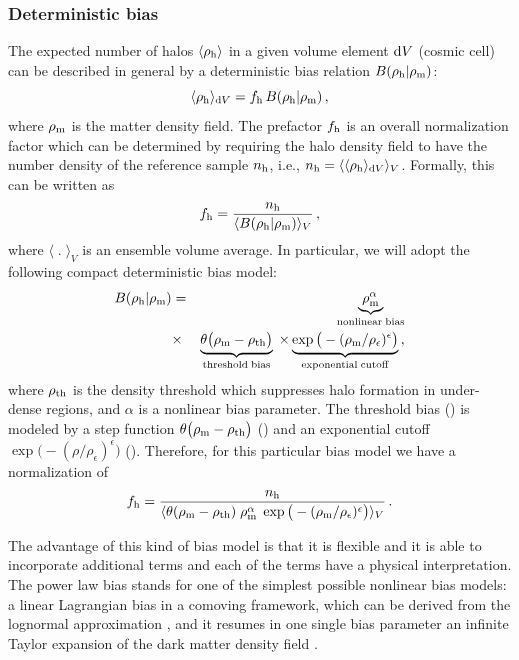 \documentclass[english,usenatbib]{mn2e}
\newcommand{\tod}[1]{{\textcolor{red}{ #1}}}
\newcommand{\be}{\begin{equation}}
\newcommand{\ee}{\end{equation}}
\newcommand{\ba}{\begin{eqnarray}}
\newcommand{\ea}{\end{eqnarray}}
\begin{document}
\subsubsection{Deterministic bias}

The expected number of halos $\langle \rho_{\rm h} \rangle$ in a given volume element ${\rm d}V$ (cosmic cell) can be described in general by a deterministic bias relation $B(\rho_{\rm h}|\rho_{\rm m})$:
\be
\langle \rho_{\rm h} \rangle_{{\rm d}V} = f_{\rm h}\, B(\rho_{\rm h}|\rho_{\rm m})\,,
\ee
where $\rho_{\rm m}$ is the matter density field. The prefactor $f_{\rm h}$ is an overall normalization factor which can be determined by requiring the halo density field to have the number density of the reference sample $n_{\rm h}$, i.e., $n_{\rm h}=\langle\langle \rho_{\rm h}\rangle_{{\rm d}V}\rangle_{V}$. Formally, this can be written as 
\be
f_{\rm h} = \frac{n_{\rm h}}{\langle B(\rho_{\rm h}|\rho_{\rm m}) \rangle_{V}}\,,
\ee
where  $\langle \;.\; \rangle_{V}$ is an ensemble volume average. 
In particular, we will adopt the following compact deterministic bias model:
\ba
B(\rho_{\rm h}|\rho_{\rm m}) &=&  \underbrace{\rho_{\rm  m}^\alpha}_{\mathrm{nonlinear \; bias}} \nonumber \\ 
&\times& \underbrace{\theta\big(\rho_{\rm m} - \rho_{\rm th}\big)}_{\mathrm{threshold \; bias}} \; \times \underbrace{\exp \big(-(\rho_{\rm m}/\rho_{\epsilon})^{\epsilon}\big)}_{\mathrm{exponential \; cutoff}}\,,
\label{eq:deterministic}
\ea
where $\rho_{\rm th}$ is the density threshold which suppresses halo formation in under-dense regions, and $\alpha$ is a nonlinear bias parameter.
The threshold bias (\citealt{kaiser1984,bardeen1986,sheth2001,mo2002}) is modeled by a step function $\theta \big(\rho_{\rm m} - \rho_{\rm th}\big)$ (\citealt{kitaura2014}) and an exponential cutoff $\exp \big(-(\rho/\rho_{\epsilon})^{\epsilon}\big)$ (\citealt{neyrinck2014}). 
Therefore, for this particular bias model we have a normalization of 
\be
f_{\rm h} = \frac{n_{\rm h}}{\langle \theta(\rho_{\rm m}-\rho_{\rm th})\; \rho_{\rm m}^{\alpha}\; \exp \big(-(\rho_{\rm m}/\rho_{\epsilon})^{\epsilon}\big) \rangle_{V}}\,.
\label{eq:normalization}
\ee

The advantage of this kind of bias model is that it is flexible and it is able to incorporate additional terms and each of the terms have a physical interpretation.
The power law bias stands for one of the simplest possible nonlinear bias models: a linear Lagrangian bias in a comoving framework, which can be derived from the lognormal approximation \tod{\citep[see][]{kitaura2014}}, and it resumes in one single bias parameter an infinite Taylor expansion of the dark matter density field \citep{cen1993,fry1993,delatorre}.
\end{document}
